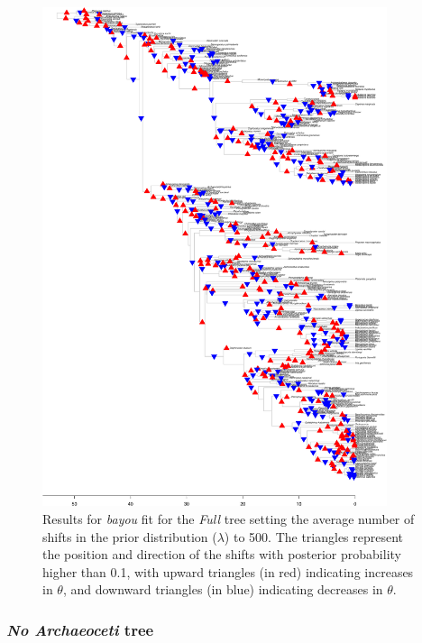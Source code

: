 \begin{figure}[H]
\includegraphics[width=0.9\textwidth]{img/plots-full-wZBL-k500-1.pdf}
\caption{Results for \textit{bayou} fit for the \textit{Full} tree setting the average number of shifts in the prior distribution ($\lambda$) to 500. The triangles represent the position and direction of the shifts with posterior probability higher than 0.1, with upward triangles (in red) indicating increases in $\theta$, and downward triangles (in blue) indicating decreases in $\theta$.}
\label{fig:full-k500}
\end{figure}

\subsubsection{\textit{No Archaeoceti} tree}

